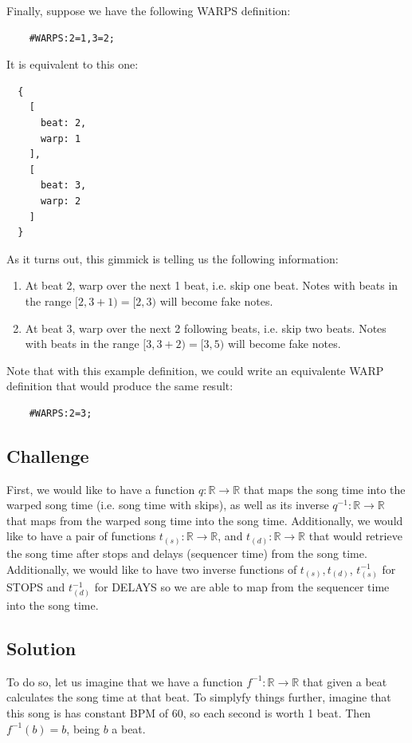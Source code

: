 \documentclass[a4paper,9pt]{article}
\begin{document}
    Finally, suppose we have the following WARPS definition:
    \begin{verbatim}
    #WARPS:2=1,3=2;     
    \end{verbatim}
    It is equivalent to this one:
    \begin{verbatim}
  {
    [
      beat: 2,
      warp: 1
    ],
    [
      beat: 3,
      warp: 2
    ]
  }
    \end{verbatim}
    As it turns out, this gimmick is telling us the following information:
    \begin{enumerate}
	    \item At beat 2, warp over the next 1 beat, i.e. skip one beat. Notes with beats in the range $ [2, 3+1) = [2,3) $ will become fake notes.
	    \item At beat 3, warp over the next 2 following beats, i.e. skip two beats. Notes with beats in the range $ [3, 3+2) = [3,5) $ will become fake notes.
    \end{enumerate}
    Note that with this example definition, we could write an equivalente WARP definition that would produce the same result:
    \begin{verbatim}
    #WARPS:2=3;     
    \end{verbatim}

    \subsection{Challenge}
    First, we would like to have a function $ q: \mathbb{R}\rightarrow \mathbb{R} $ that maps the song time into the warped song time (i.e. song time with skips), as well as its inverse $ q^{-1}:\mathbb{R}\rightarrow \mathbb{R}  $ that maps from the warped song time into the song time.
    Additionally, we would like to have a pair of functions $ t_{(s)}: \mathbb{R} \rightarrow \mathbb{R}$, and $ t_{(d)}: \mathbb{R} \rightarrow \mathbb{R} $ that would retrieve the song time after stops and delays (sequencer time) from the song time. Additionally, we would like to have two inverse functions of $ t_{(s)}, t_{(d)} $, $ t^{-1}_{(s)} $ for STOPS and $ t^{-1}_{(d)} $ for DELAYS so we are able to map from the sequencer time into the song time.


    \subsection{Solution}

    To do so, let us imagine that we have a function $ f^{-1} : \mathbb{R}\rightarrow \mathbb{R}$ that given a beat calculates the song time at that beat. To simplyfy things further, imagine that this song is has constant BPM of 60, so each second is worth 1 beat. Then $ f^{-1}(b) = b $, being $ b $ a beat.
\end{document}
